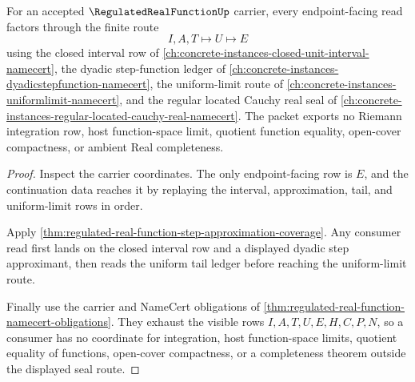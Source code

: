 \begin{theorem}
\label{thm:regulated-real-function-uniform-limit-seal-nonescape}
For an accepted $\RegulatedRealFunctionUp$ carrier, every endpoint-facing read factors through the finite route
$$
I,A,T \longmapsto U \longmapsto E
$$
using the closed interval row of \autoref{ch:concrete-instances-closed-unit-interval-namecert}, the dyadic step-function ledger of \autoref{ch:concrete-instances-dyadicstepfunction-namecert}, the uniform-limit route of \autoref{ch:concrete-instances-uniformlimit-namecert}, and the regular located Cauchy real seal of \autoref{ch:concrete-instances-regular-located-cauchy-real-namecert}. The packet exports no Riemann integration row, host function-space limit, quotient function equality, open-cover compactness, or ambient Real completeness.
\end{theorem}
\begin{proof}
Inspect the carrier coordinates. The only endpoint-facing row is $E$, and the continuation data reaches it by replaying the interval, approximation, tail, and uniform-limit rows in order.

Apply \autoref{thm:regulated-real-function-step-approximation-coverage}. Any consumer read first lands on the closed interval row and a displayed dyadic step approximant, then reads the uniform tail ledger before reaching the uniform-limit route.

Finally use the carrier and NameCert obligations of \autoref{thm:regulated-real-function-namecert-obligations}. They exhaust the visible rows $I,A,T,U,E,H,C,P,N$, so a consumer has no coordinate for integration, host function-space limits, quotient equality of functions, open-cover compactness, or a completeness theorem outside the displayed seal route.
\end{proof}

